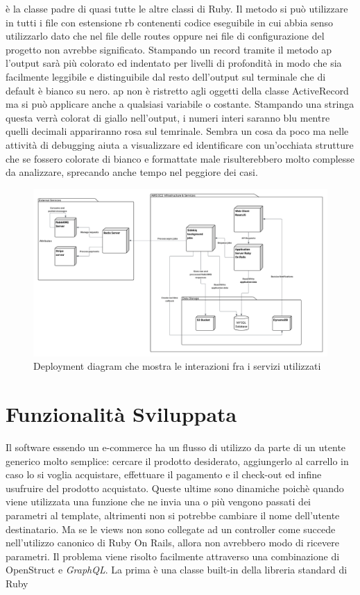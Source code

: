 \documentclass[target=bach,aauheader=,style=]{thud}
\begin{document}
è la classe padre di quasi tutte le altre classi di Ruby. Il metodo si può utilizzare in tutti i file con estensione rb contenenti codice eseguibile in cui abbia senso utilizzarlo
dato che nel file delle routes oppure nei file di configurazione del progetto non avrebbe significato.
Stampando un record tramite il metodo ap l'output sarà più colorato ed indentato per livelli di profondità in modo che sia facilmente leggibile e distinguibile dal resto
dell'output sul terminale che di default è bianco su nero. ap non è ristretto agli oggetti della classe ActiveRecord ma si può applicare anche a qualsiasi variabile o costante.
Stampando una stringa questa verrà colorat di giallo nell'output, i numeri interi saranno blu mentre quelli decimali appariranno rosa sul temrinale.
Sembra un cosa da poco ma nelle attività di debugging aiuta a visualizzare ed identificare con un'occhiata strutture che se fossero colorate di bianco e formattate male
risulterebbero molto complesse da analizzare, sprecando anche tempo nel peggiore dei casi.


\begin{figure}[h]
\centering
\includegraphics[width=1\linewidth]{Deployment Diagram.png}
\caption{Deployment diagram che mostra le interazioni fra i servizi utilizzati}
\label{fig:dep_diagram}
\end{figure}

\chapter{Funzionalità Sviluppata}

Il software essendo un e-commerce ha un flusso di utilizzo da parte di un utente generico molto semplice: cercare il prodotto desiderato,
aggiungerlo al carrello in caso lo si voglia acquistare, effettuare il pagamento e il check-out ed infine usufruire del prodotto acquistato.
Queste ultime sono dinamiche poichè quando viene utilizzata una funzione che ne invia una o più vengono passati dei parametri al template, altrimenti non si
potrebbe cambiare il nome dell'utente destinatario. Ma se le views non sono collegate ad un controller come succede nell'utilizzo canonico di Ruby On Rails, allora
non avrebbero modo di ricevere parametri. Il problema viene risolto facilmente attraverso una combinazione di OpenStruct e \textit{GraphQL}.
La prima è una classe built-in della libreria standard di Ruby
\end{document}
